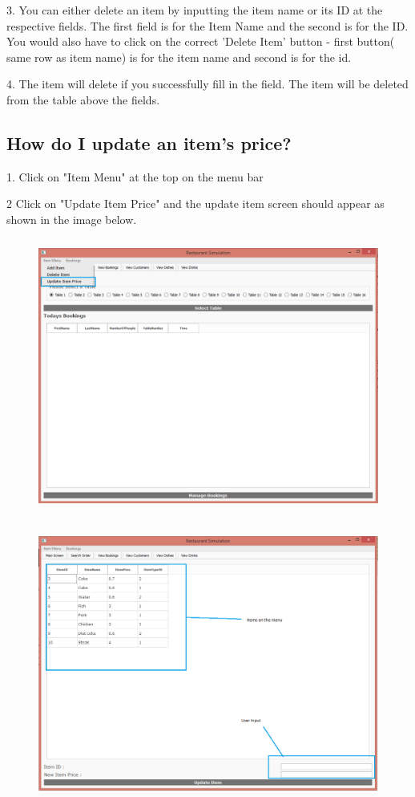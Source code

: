 3.  You can either delete an item by inputting the item name or its ID at the respective fields. The first field is for the Item Name and the second is for the ID. You would also have to click on the correct 'Delete Item' button - first button( same row as item name) is for the item name and second is for the id.

4. The item will delete if you successfully fill in the field. The item will be deleted from the table above the fields.

\newpage
\subsection{How do I update an item's price?}
1. Click on "Item Menu" at the top on the menu bar

2 Click on "Update Item Price" and the  update item screen should appear as shown in the image below.
\begin{figure}[H]
    \includegraphics[height = 9cm]{./Manual/images/UpdateItem1} 
    \caption{} \label{fig:updateitem1}
\end{figure}

\begin{figure}[H]
    \includegraphics[height = 9cm]{./Manual/images/UpdateItem2} 
    \caption{} \label{fig:updateitem2}
\end{figure}

